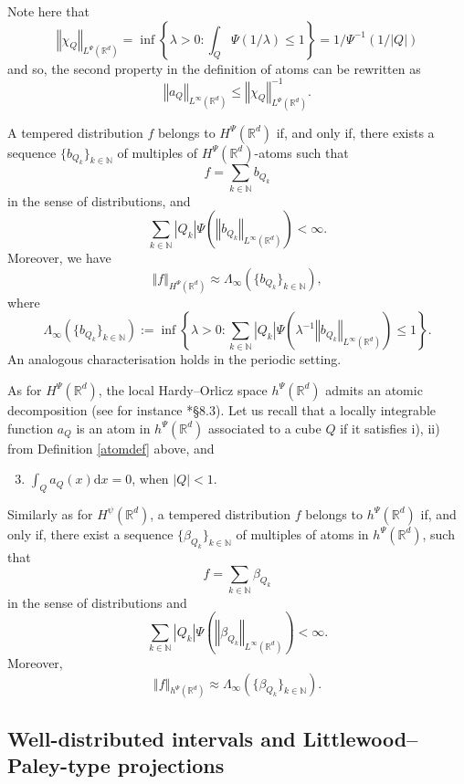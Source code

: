 \documentclass[a4paper, leqno, 10pt]{amsart}
\numberwithin{equation}{section}
\newcommand{\dd}{\mathrm{d}}
\newcommand{\R}{\mathbb{R}}
\newcommand{\norm}[1]{\left\Vert#1\right\Vert}
\newcommand{\brkt}[1]{\left(#1\right)}
\newcommand{\abs}[1]{\left|#1\right|}
\newcommand{\set}[1]{\left\{#1\right\}}
\newcommand{\N}{\mathbb{N}}
\begin{document}
Note here that 
\[
\norm{\chi_Q}_{L^{\Psi}(\R^d)}=\inf\set{\lambda > 0 : \int_Q \Psi(1/\lambda)\leq 1}=1/\Psi^{-1}(1/\abs{Q}) 
\]
and so, the second property in the definition of atoms can be rewritten as
\[ \norm{a_Q}_{L^{\infty} (\R^d)} \leq \norm{\chi_Q}^{-1}_{L^{\Psi}(\R^d)} .\] 

A tempered distribution $f $ belongs to $ H^{\Psi} (\R^d)$ if, and only if, there exists a sequence $\{ b_{Q_k} \}_{k \in \N}$ of multiples of $H^{\Psi} (\R^d)$-atoms such that
\[
f = \sum_{k \in \N} b_{Q_k} 
\]
in the sense of distributions, and
\[
\sum_{k \in \N} \abs{Q_k} \Psi \brkt{ \norm{b_{Q_k}}_{L^{\infty} (\R^d)} } < \infty. 
\]
Moreover, we have
\[
\norm{f}_{H^{\Psi} (\R^d)} \approx \Lambda_{\infty} \brkt{\{ b_{Q_k} \}_{k \in \N}} ,
\]
where
\[ 
\Lambda_{\infty} \brkt{\{ b_{Q_k} \}_{k \in \N} } := 
\inf \left\{  \lambda > 0 : \sum_{k \in \N} \abs{Q_k} \Psi \brkt{ \lambda^{-1} \norm{b_{Q_k}}_{L^{\infty} (\R^d)} } \leq 1 \right\} . 
\]
An analogous characterisation holds in the periodic setting.

%
As for $H^{\Psi} (\R^d)$, the local Hardy--Orlicz space $h^{\Psi} (\R^d)$ admits an atomic decomposition (see for instance \cite{YLK}*{\S 8.3}). Let us recall that a locally integrable function $a_Q$ is an atom in $h^{\Psi} (\R^d)$ associated to a cube $Q$ if it satisfies i), ii) from Definition \ref{atomdef} above, and 
\begin{enumerate}[label=\roman*)']\setcounter{enumi}{2}
\item $\int_Q a_Q (x)\dd x=0$, when $\abs{Q}<1$.
\end{enumerate}
	
%
%

Similarly as for $H^\psi(\R^d)$, a tempered distribution $f $ belongs to $h^{\Psi} (\R^d)$ if, and only if, there exist a sequence $\{\beta_{Q_k} \}_{k\in \N}$ of multiples of atoms in $h^{\Psi} (\R^d)$, such that
\[
f = \sum_{k \in \N} \beta_{Q_k}
\]
in the sense of distributions and
\[
\sum_{k \in \N} \abs{Q_k} \Psi \brkt{ \norm{\beta_{Q_k}}_{L^{\infty} (\R^d)} } < \infty. 
\]
Moreover, 
\[
\norm{f}_{h^{\Psi} (\R^d)} \approx \Lambda_{\infty} \brkt{\{ \beta_{Q_k} \}_{k \in \N} }.
\]

%
\subsection{Well-distributed intervals and Littlewood--Paley-type projections}\label{LP_part}  
\end{document}
